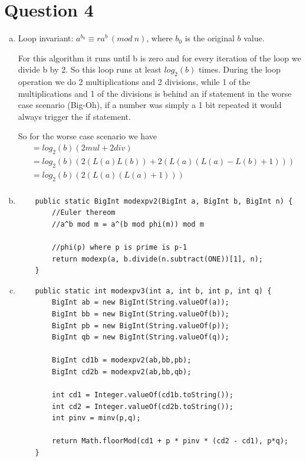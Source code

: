 \documentclass[journal,a4paper]{article}
\begin{document}
\section*{Question 4}
\begin{enumerate}[(a)]
	\item Loop invariant: $a^{b_0} \equiv ra^b\ (mod\ n)$, where $b_0$ is the original $b$ value.
	
		  For this algorithm it runs until b is zero and for every iteration of the loop we divide b by 2. So this loop runs at least $log_2(b)$ times. During the loop operation we do 2 multiplications and 2 divisions, while 1 of the multiplications and 1 of the divisions is behind an if statement in the worse case scenario (Big-Oh), if a number was simply a 1 bit repeated it would always trigger the if statement.
		  
		  So for the worse case scenario we have
		  \begin{align*}
		  	&= log_2(b)(2mul + 2div) \\
		  	&= log_2(b)(2(L(a)L(b)) + 2(L(a)(L(a)-L(b)+1))) \\
		  	&= log_2(b)(2(L(a)(L(a)+1))) \\
		  \end{align*}
	\item \begin{lstlisting}
	public static BigInt modexpv2(BigInt a, BigInt b, BigInt n) {
		//Euler thereom
		//a^b mod m = a^(b mod phi(m)) mod m

		//phi(p) where p is prime is p-1
		return modexp(a, b.divide(n.subtract(ONE))[1], n);
	}
	\end{lstlisting}
	
	\item \begin{lstlisting}
	public static int modexpv3(int a, int b, int p, int q) {
		BigInt ab = new BigInt(String.valueOf(a));
		BigInt bb = new BigInt(String.valueOf(b));
		BigInt pb = new BigInt(String.valueOf(p));
		BigInt qb = new BigInt(String.valueOf(q));

		BigInt cd1b = modexpv2(ab,bb,pb);
		BigInt cd2b = modexpv2(ab,bb,qb);

		int cd1 = Integer.valueOf(cd1b.toString());
		int cd2 = Integer.valueOf(cd2b.toString());
		int pinv = minv(p,q);

		return Math.floorMod(cd1 + p * pinv * (cd2 - cd1), p*q);
	}
	\end{lstlisting}
\end{enumerate}
\end{document}
